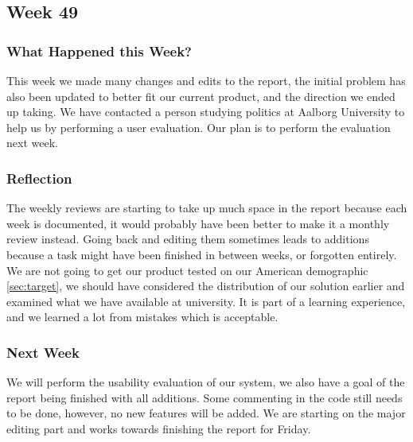 \subsection{Week 49}
\subsubsection{What Happened this Week?}
This week we made many changes and edits to the report, the initial problem has
also been updated to better fit our current product, and the direction we ended
up taking. We have contacted a person studying politics at Aalborg University to
help us by performing a user evaluation. Our plan is to perform the evaluation
next week.

\subsubsection{Reflection}
The weekly reviews are starting to take up much space in the report because each
week is documented, it would probably have been better to make it a monthly
review instead. Going back and editing them sometimes leads to additions because
a task might have been finished in between weeks, or forgotten entirely. We are
not going to get our product tested on our American demographic
\autoref{sec:target}, we should have considered the distribution of our solution
earlier and examined what we have available at university. It is part of a
learning experience, and we learned a lot from mistakes which is
acceptable.

\subsubsection{Next Week}
We will perform the usability evaluation of our system, we also have a goal of
the report being finished with all additions. Some commenting in the code still
needs to be done, however, no new features will be added. We are starting on the
major editing part and works towards finishing the report for Friday.



% 
% 
% 
